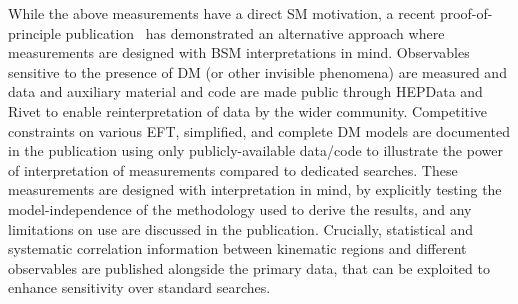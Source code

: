\documentclass[a4paper,aps,prd,longbibliography,notitlepage,showpacs,amsmath,amssymb,superscriptaddress,nofootinbib,floatfix,11pt,preprintnumbers]{revtex4-1-mod}
\newcommand{\hepdata}{\textsf{HEPData}\xspace}
\newcommand{\rivet}{\textsf{Rivet}\xspace}
\begin{document}
While the above measurements have a direct SM motivation, a recent proof-of-principle publication~\cite{Aaboud:2017buf} has demonstrated an alternative approach where measurements
are designed with BSM interpretations in mind. Observables sensitive to the presence of DM (or other invisible phenomena) are measured and data and auxiliary material and code are made public through \hepdata and \rivet to enable reinterpretation of data by the wider community. Competitive constraints on various EFT, simplified, and complete DM models are documented in the publication using only publicly-available data/code to illustrate the power of interpretation of measurements compared to dedicated searches. These measurements are designed with interpretation in mind, by explicitly testing the model-independence of the methodology used to derive the results, and any limitations on use are discussed in the publication. Crucially, statistical and systematic correlation information between kinematic regions and different observables are published alongside the primary data, that can be exploited to enhance sensitivity over standard searches.
\end{document}
